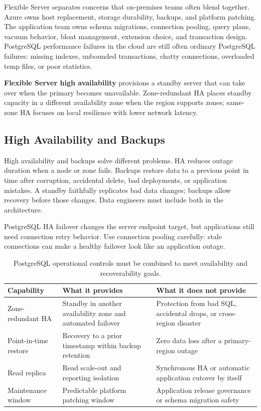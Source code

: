 Flexible Server separates concerns that on-premises teams often blend together. Azure owns host replacement, storage durability, backups, and platform patching. The application team owns schema migrations, connection pooling, query plans, vacuum behavior, bloat management, extension choice, and transaction design. PostgreSQL performance failures in the cloud are still often ordinary PostgreSQL failures: missing indexes, unbounded transactions, chatty connections, overloaded temp files, or poor statistics.

\begin{definitionbox}
\textbf{Flexible Server high availability} provisions a standby server that can take over when the primary becomes unavailable. Zone-redundant HA places standby capacity in a different availability zone when the region supports zones; same-zone HA focuses on local resilience with lower network latency.
\end{definitionbox}

\subsection{High Availability and Backups}
High availability and backups solve different problems. HA reduces outage duration when a node or zone fails. Backups restore data to a previous point in time after corruption, accidental delete, bad deployments, or application mistakes. A standby faithfully replicates bad data changes; backups allow recovery before those changes. Data engineers must include both in the architecture.

\begin{notebox}
PostgreSQL HA failover changes the server endpoint target, but applications still need connection retry behavior. Use connection pooling carefully: stale connections can make a healthy failover look like an application outage.
\end{notebox}

\begin{table}[H]
\centering
\small
\begin{tabular}{@{}p{3.1cm}p{4.6cm}p{4.9cm}@{}}
\toprule
\textbf{Capability} & \textbf{What it provides} & \textbf{What it does not provide} \\
\midrule
Zone-redundant HA & Standby in another availability zone and automated failover & Protection from bad SQL, accidental drops, or cross-region disaster \\
Point-in-time restore & Recovery to a prior timestamp within backup retention & Zero data loss after a primary-region outage \\
Read replica & Read scale-out and reporting isolation & Synchronous HA or automatic application cutover by itself \\
Maintenance window & Predictable platform patching window & Application release governance or schema migration safety \\
\bottomrule
\end{tabular}
\caption{PostgreSQL operational controls must be combined to meet availability and recoverability goals.}
\label{tab:postgres-ha-backups}
\end{table}

